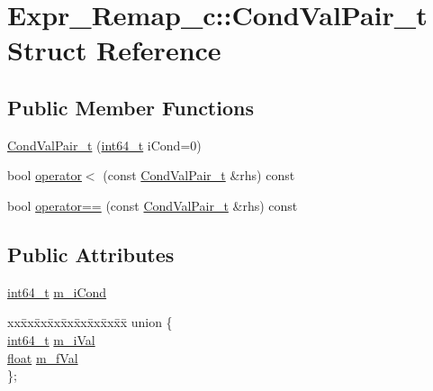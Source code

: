 \hypertarget{structExpr__Remap__c_1_1CondValPair__t}{\section{Expr\-\_\-\-Remap\-\_\-c\-:\-:Cond\-Val\-Pair\-\_\-t Struct Reference}
\label{structExpr__Remap__c_1_1CondValPair__t}
}
\subsection*{Public Member Functions}
\begin{DoxyCompactItemize}
\item 
\hyperlink{structExpr__Remap__c_1_1CondValPair__t_aef64d97d99a2312d52afc97147eca599}{Cond\-Val\-Pair\-\_\-t} (\hyperlink{sphinxstd_8h_a996e72f71b11a5bb8b3b7b6936b1516d}{int64\-\_\-t} i\-Cond=0)
\item 
bool \hyperlink{structExpr__Remap__c_1_1CondValPair__t_aa1c1215916aa5f667abb1f2241b9a87a}{operator$<$} (const \hyperlink{structExpr__Remap__c_1_1CondValPair__t}{Cond\-Val\-Pair\-\_\-t} \&rhs) const 
\item 
bool \hyperlink{structExpr__Remap__c_1_1CondValPair__t_a3638f7c2e25c6ff4a757e87531a13a2f}{operator==} (const \hyperlink{structExpr__Remap__c_1_1CondValPair__t}{Cond\-Val\-Pair\-\_\-t} \&rhs) const 
\end{DoxyCompactItemize}
\subsection*{Public Attributes}
\begin{DoxyCompactItemize}
\item 
\hyperlink{sphinxstd_8h_a996e72f71b11a5bb8b3b7b6936b1516d}{int64\-\_\-t} \hyperlink{structExpr__Remap__c_1_1CondValPair__t_a6d4c8daff74b600832542b0f973821a6}{m\-\_\-i\-Cond}
\item 
\begin{tabbing}
xx\=xx\=xx\=xx\=xx\=xx\=xx\=xx\=xx\=\kill
union \{\\
\>\hyperlink{sphinxstd_8h_a996e72f71b11a5bb8b3b7b6936b1516d}{int64\_t} \hyperlink{structExpr__Remap__c_1_1CondValPair__t_a6f82fb3184aea275c2f83ba09a906117}{m\_iVal}\\
\>\hyperlink{sphinxexpr_8cpp_a0e0d0739f7035f18f949c2db2c6759ec}{float} \hyperlink{structExpr__Remap__c_1_1CondValPair__t_ac431ac6becb20459de8306a584490031}{m\_fVal}\\
\}; \\

\end{tabbing}\end{DoxyCompactItemize}



